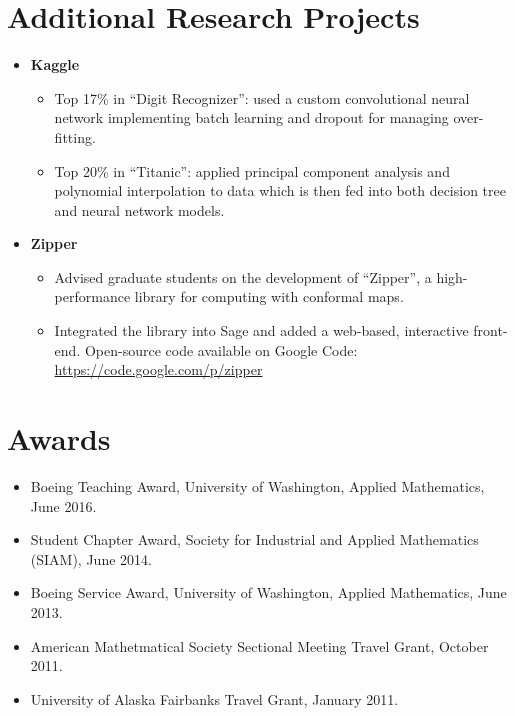 \documentclass{article}
\begin{document}
\section*{Additional Research Projects}

\begin{itemize}
  \setlength{\itemsep}{0pt}
  \item {\bf Kaggle}
    \begin{itemize}
    \item Top 17\% in ``Digit Recognizer'': used a custom convolutional neural
      network implementing batch learning and dropout for managing over-fitting.
    \item Top 20\% in ``Titanic'': applied principal component analysis and
      polynomial interpolation to data which is then fed into both decision tree
      and neural network models.
    \end{itemize}
  \item {\bf Zipper}
    \begin{itemize}
    \item Advised graduate students on the development of ``Zipper'', a
      high-performance library for computing with conformal maps.
    \item Integrated the library into Sage and added a web-based, interactive
      front-end. Open-source code available on Google Code:
      \url{https://code.google.com/p/zipper}
    \end{itemize}
\end{itemize}


\section*{Awards}

\begin{itemize}
  \setlength{\itemsep}{0pt}
  \item Boeing Teaching Award, University of Washington, Applied
    Mathematics, June 2016.
  \item Student Chapter Award, Society for Industrial and Applied Mathematics
    (SIAM), June 2014.
  \item Boeing Service Award, University of Washington, Applied
    Mathematics, June 2013.
  \item American Mathetmatical Society Sectional Meeting Travel Grant,
    October 2011.
  \item University of Alaska Fairbanks Travel Grant, January 2011.
\end{itemize}
\end{document}
